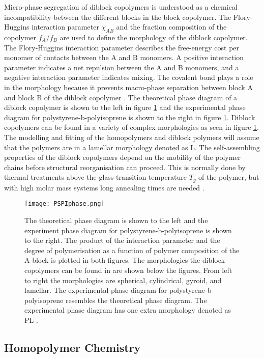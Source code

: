 \documentclass[MasterThesisMain.tex]{subfiles}
\begin{document}
Micro-phase segregation of diblock copolymers is understood as a chemical incompatibility between the different blocks in the block copolymer. The Flory-Huggins interaction parameter $\chi_{AB}$ and the fraction composition of the copolymer $f_A$/$f_B$ are used to define the morphology of the diblock copolymer. The Flory-Huggins interaction parameter describes the free-energy cost per monomer of contacts between the A and B monomers. A positive interaction parameter indicates a net repulsion between the A and B monomers, and a negative interaction parameter indicates mixing. The covalent bond plays a role in the morphology because it prevents macro-phase separation between block A and block B of the diblock copolymer \cite{designpolymers}. The theoretical phase diagram of a diblock copolymer is shown to the left in figure \ref{fig:blockfase} and the experimental phase diagram for polystyrene-b-polyisoprene is shown to the right in figure \ref{fig:blockfase}. Diblock copolymers can be found in a variety of complex morphologies as seen in figure \ref{fig:blockfase}. The modelling and fitting of the homopolymers and diblock polymers will assume that the polymers are in a lamellar morphology denoted as L. The self-assembling properties of the diblock copolymers depend on the mobility of the polymer chains before structural reorganisation can proceed. This is normally done by thermal treatments above the glass transition temperature $T_g$ of the polymer, but with high molar mass systems long annealing times are needed \cite{SVABCP}.

\begin{figure}[H]
\centering
\texttt{[image: PSPIphase.png]}
\caption{The theoretical phase diagram is shown to the left and the experiment phase diagram for polystyrene-b-polyisoprene is shown to the right. The product of the interaction parameter and the degree of polymerisation as a function of polymer composition of the A block is plotted in both figures. The morphologies the diblock copolymers can be found in are shown below the figures. From left to right the morphologies are spherical, cylindrical, gyroid, and lamellar. The experimental phase diagram for polystyrene-b-polyisoprene resembles the theoretical phase diagram. The experimental phase diagram has one extra morphology denoted as PL \cite{designpolymers}.}
\label{fig:blockfase}
\end{figure}
 

\subsection{Homopolymer Chemistry}
\newcommand\setpolymerdelim[2]{\def\delimleft{#1}\def\delimright{#2}}
\def\makebraces[#1,#2]#3#4#5{%
\edef\delimhalfdim{\the\dimexpr(#1+#2)/2}%
\edef\delimvshift{\the\dimexpr(#1-#2)/2}%
\chemmove{%
\node[at=(#4),yshift=(\delimvshift)]
{$\left\delimleft\vrule height\delimhalfdim depth\delimhalfdim
width0pt\right.$};%
\node[at=(#5),yshift=(\delimvshift)]
{$\left.\vrule height\delimhalfdim depth\delimhalfdim
width0pt\right\delimright_{\rlap{$\scriptstyle#3$}}$};}}
\end{document}
